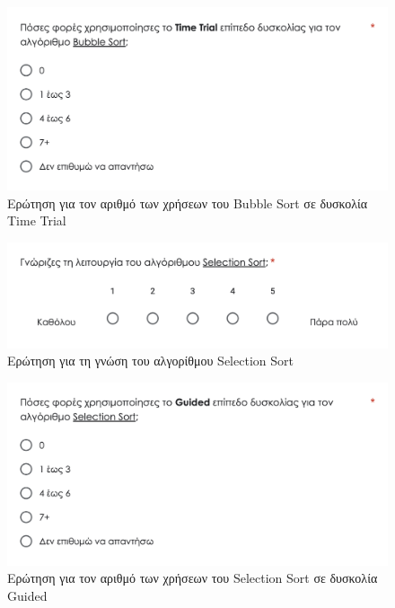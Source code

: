 \begin{figure}[H]
    \centering
    \includegraphics[width=0.8\linewidth]{sections/appendices/b/images/survey_bubblesort_timetrial_usages}
    \caption{Ερώτηση για τον αριθμό των χρήσεων του Bubble Sort σε δυσκολία Time Trial}
    \label{fig:survey_bubblesort_timetrial_usages}
\end{figure}


\begin{figure}[H]
    \centering
    \includegraphics[width=0.8\linewidth]{sections/appendices/b/images/survey_selectionsort_knowledge}
    \caption{Ερώτηση για τη γνώση του αλγορίθμου Selection Sort}
    \label{fig:survey_selectionsort_knowledge}
\end{figure}

\begin{figure}[H]
    \centering
    \includegraphics[width=0.8\linewidth]{sections/appendices/b/images/survey_selectionsort_guided_usages}
    \caption{Ερώτηση για τον αριθμό των χρήσεων του Selection Sort σε δυσκολία Guided}
    \label{fig:survey_selectionsort_guided_usages}
\end{figure}

